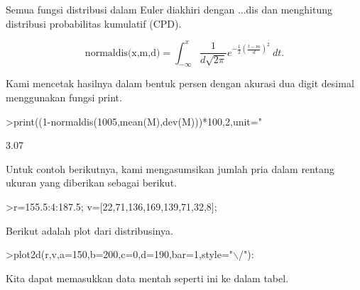 \documentclass[12pt,arial,letterpaper]{book}
\begin{document}
\begin{eulercomment}
\begin{eulercomment}
\begin{eulercomment}
\begin{eulercomment}
\begin{eulercomment}
\begin{eulercomment}
\begin{eulercomment}
\begin{eulercomment}
\begin{eulercomment}
\begin{eulercomment}
\begin{eulercomment}
\begin{eulercomment}
\begin{eulercomment}
\begin{eulercomment}
\begin{eulercomment}
\begin{eulercomment}
\begin{eulercomment}
\begin{eulercomment}
\begin{eulercomment}
\begin{eulercomment}
\begin{eulercomment}
\begin{eulercomment}
\begin{eulercomment}
\begin{eulercomment}
\begin{eulercomment}
\begin{eulercomment}
\begin{eulercomment}
\begin{eulercomment}
\begin{eulercomment}
\begin{eulercomment}
\begin{eulercomment}
\begin{eulercomment}
\begin{eulercomment}
Semua fungsi distribusi dalam Euler diakhiri dengan ...dis dan
menghitung distribusi probabilitas kumulatif (CPD).

\end{eulercomment}
\begin{eulerformula}
\[
\text{normaldis(x,m,d)}=\int_{-\infty}^x \frac{1}{d\sqrt{2\pi}}e^{-\frac{1}{2}(\frac{t-m}{d})^2}\ dt.
\]
\end{eulerformula}
\begin{eulercomment}
Kami mencetak hasilnya dalam bentuk persen dengan akurasi dua digit
desimal menggunakan fungsi print.
\end{eulercomment}
\begin{eulerprompt}
>print((1-normaldis(1005,mean(M),dev(M)))*100,2,unit=" %
\end{eulerprompt}
\begin{euleroutput}
        3.07 %
\end{euleroutput}
\begin{eulercomment}
Untuk contoh berikutnya, kami mengasumsikan jumlah pria dalam rentang
ukuran yang diberikan sebagai berikut.
\end{eulercomment}
\begin{eulerprompt}
>r=155.5:4:187.5; v=[22,71,136,169,139,71,32,8];
\end{eulerprompt}
\begin{eulercomment}
Berikut adalah plot dari distribusinya.
\end{eulercomment}
\begin{eulerprompt}
>plot2d(r,v,a=150,b=200,c=0,d=190,bar=1,style="\(\backslash\)/"):
\end{eulerprompt}
\begin{eulercomment}
Kita dapat memasukkan data mentah seperti ini ke dalam tabel.


\end{eulercomment}
\end{eulercomment}
\end{eulercomment}
\end{eulercomment}
\end{eulercomment}
\end{eulercomment}
\end{eulercomment}
\end{eulercomment}
\end{eulercomment}
\end{eulercomment}
\end{eulercomment}
\end{eulercomment}
\end{eulercomment}
\end{eulercomment}
\end{eulercomment}
\end{eulercomment}
\end{eulercomment}
\end{eulercomment}
\end{eulercomment}
\end{eulercomment}
\end{eulercomment}
\end{eulercomment}
\end{eulercomment}
\end{eulercomment}
\end{eulercomment}
\end{eulercomment}
\end{eulercomment}
\end{eulercomment}
\end{eulercomment}
\end{eulercomment}
\end{eulercomment}
\end{eulercomment}
\end{eulercomment}
\end{document}
